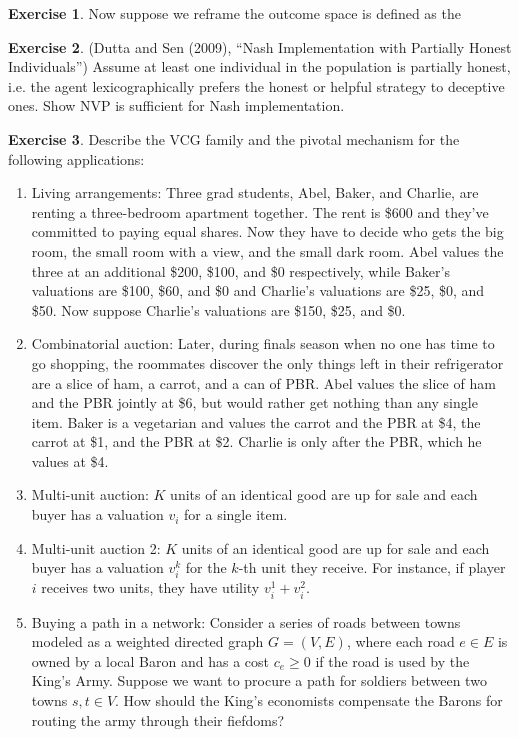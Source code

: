 \documentclass[letter, 10pt]{article}
\theoremstyle{definition}
\newtheorem{exercise}{Exercise}[section]
\begin{document}
\begin{spacing}{1.1}
\begin{exercise}
  Now suppose we reframe the  outcome space is defined as the 
\end{exercise}

\begin{exercise}
  (Dutta and Sen (2009), ``Nash Implementation with Partially Honest
  Individuals'') Assume at least one individual in the population is
  partially honest, i.e. the agent lexicographically prefers the honest or
  helpful strategy to deceptive ones. Show NVP is sufficient for Nash
  implementation.
\end{exercise}

\begin{exercise}
  Describe the VCG family and the pivotal
  mechanism for the following applications:
  \begin{enumerate}
  \item Living arrangements: Three grad students, Abel, Baker, and Charlie,
    are renting a three-bedroom apartment together. The rent is \$600 and
    they've committed to paying equal shares. Now they have to decide who
    gets the big room, the small room with a view, and the small dark
    room. Abel values the three at an additional \$200, \$100, and \$0
    respectively, while Baker's valuations are \$100, \$60, and \$0 and Charlie's
    valuations are \$25, \$0, and \$50. Now suppose Charlie's valuations
    are \$150, \$25, and \$0.
  \item Combinatorial auction: Later, during finals season when no one has
    time to go shopping, the roommates discover the only things left in
    their refrigerator are a slice of ham, a carrot, and a can of PBR. Abel
    values the slice of ham and the PBR jointly at \$6, but would rather
    get nothing than any single item. Baker is a vegetarian and values the
    carrot and the PBR at \$4, the carrot at \$1, and the PBR at
    \$2. Charlie is only after the PBR, which he values at \$4.
  \item Multi-unit auction: $K$ units of an identical good are up for sale
    and each buyer has a valuation $v_i$ for a single item.
  \item Multi-unit auction 2: $K$ units of an identical good are up for
    sale and each buyer has a valuation $v_i^k$ for the $k$-th unit they
    receive. For instance, if player $i$ receives two units, they have
    utility $v_i^1+v_i^2$.
  \item Buying a path in a network: Consider a series of roads between
    towns modeled as a weighted directed graph $G=(V,E)$, where each road
    $e\in E$ is owned by a local Baron and has a cost $c_e \geq 0$ if the
    road is used by the King's Army. Suppose we want to procure a path for
    soldiers between two towns $s,t \in V$. How should the King's
    economists compensate the Barons for routing the army through their
    fiefdoms?
  \end{enumerate}
\end{exercise}

\end{spacing}
\end{document}
